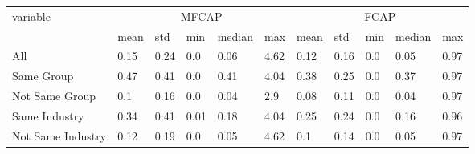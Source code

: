 \begin{tabular}{lllllllllll}
\toprule
\multirow{2}[3]{*}{variable} & \multicolumn{5}{c}{MFCAP} & \multicolumn{5}{c}{FCAP} \\
 \cmidrule(lr){2-6} \cmidrule(lr){7-11}
 &       mean &   std &   min & median &   max &         mean &   std &  min & median &   max \\
\midrule
All               &       0.15 &  0.24 &   0.0 &   0.06 &  4.62 &         0.12 &  0.16 &  0.0 &   0.05 &  0.97 \\
Same Group        &       0.47 &  0.41 &   0.0 &   0.41 &  4.04 &         0.38 &  0.25 &  0.0 &   0.37 &  0.97 \\
Not Same Group    &        0.1 &  0.16 &   0.0 &   0.04 &   2.9 &         0.08 &  0.11 &  0.0 &   0.04 &  0.97 \\
Same Industry     &       0.34 &  0.41 &  0.01 &   0.18 &  4.04 &         0.25 &  0.24 &  0.0 &   0.16 &  0.96 \\
Not Same Industry &       0.12 &  0.19 &   0.0 &   0.05 &  4.62 &          0.1 &  0.14 &  0.0 &   0.05 &  0.97 \\
\bottomrule
\end{tabular}
